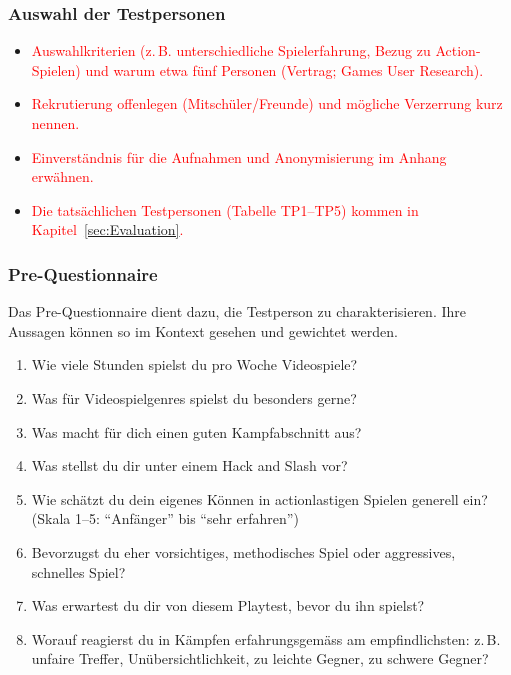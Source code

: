 \documentclass[../Main.tex]{subfiles}
\begin{document}
\subsubsection{Auswahl der Testpersonen} \label{sec:AuswahlTP}

\begin{itemize}[leftmargin=1.5cm]
    \item \textcolor{red}{Auswahlkriterien (z.\,B. unterschiedliche Spielerfahrung, Bezug zu Action-Spielen) und warum etwa fünf Personen (Vertrag; Games User Research).}
    \item \textcolor{red}{Rekrutierung offenlegen (Mitschüler/Freunde) und mögliche Verzerrung kurz nennen.}
    \item \textcolor{red}{Einverständnis für die Aufnahmen und Anonymisierung im Anhang erwähnen.}
    \item \textcolor{red}{Die tatsächlichen Testpersonen (Tabelle TP1--TP5) kommen in Kapitel~\ref{sec:Evaluation}.}
\end{itemize}

\subsubsection{Pre-Questionnaire} \label{sec:PreQuestionnaire}
 
Das Pre-Questionnaire dient dazu, die Testperson zu charakterisieren. Ihre Aussagen können so im Kontext gesehen und gewichtet werden.
 
\begin{enumerate}[label=\textbf{P\arabic*}, leftmargin=1.5cm, itemsep=0.5em]
    \item Wie viele Stunden spielst du pro Woche Videospiele?
    \item Was für Videospielgenres spielst du besonders gerne?
    \item Was macht für dich einen guten Kampfabschnitt aus?
    \item Was stellst du dir unter einem Hack and Slash vor?
    \item Wie schätzt du dein eigenes Können in actionlastigen Spielen generell ein? (Skala 1--5: \enquote{Anfänger} bis \enquote{sehr erfahren})
    \item Bevorzugst du eher vorsichtiges, methodisches Spiel oder aggressives, schnelles Spiel?
    \item Was erwartest du dir von diesem Playtest, bevor du ihn spielst?
    \item Worauf reagierst du in Kämpfen erfahrungsgemäss am empfindlichsten: z.\,B. unfaire Treffer, Unübersichtlichkeit, zu leichte Gegner, zu schwere Gegner?
\end{enumerate}
\end{document}
